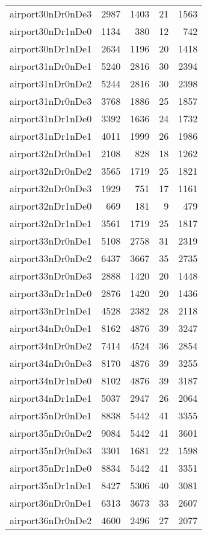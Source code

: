 \begin{longtable}{lrrrr}
airport30nDr0nDe3 & 2987 & 1403 & 21 & 1563 \\
airport30nDr1nDe0 & 1134 & 380 & 12 & 742 \\
airport30nDr1nDe1 & 2634 & 1196 & 20 & 1418 \\
airport31nDr0nDe1 & 5240 & 2816 & 30 & 2394 \\
airport31nDr0nDe2 & 5244 & 2816 & 30 & 2398 \\
airport31nDr0nDe3 & 3768 & 1886 & 25 & 1857 \\
airport31nDr1nDe0 & 3392 & 1636 & 24 & 1732 \\
airport31nDr1nDe1 & 4011 & 1999 & 26 & 1986 \\
airport32nDr0nDe1 & 2108 & 828 & 18 & 1262 \\
airport32nDr0nDe2 & 3565 & 1719 & 25 & 1821 \\
airport32nDr0nDe3 & 1929 & 751 & 17 & 1161 \\
airport32nDr1nDe0 & 669 & 181 & 9 & 479 \\
airport32nDr1nDe1 & 3561 & 1719 & 25 & 1817 \\
airport33nDr0nDe1 & 5108 & 2758 & 31 & 2319 \\
airport33nDr0nDe2 & 6437 & 3667 & 35 & 2735 \\
airport33nDr0nDe3 & 2888 & 1420 & 20 & 1448 \\
airport33nDr1nDe0 & 2876 & 1420 & 20 & 1436 \\
airport33nDr1nDe1 & 4528 & 2382 & 28 & 2118 \\
airport34nDr0nDe1 & 8162 & 4876 & 39 & 3247 \\
airport34nDr0nDe2 & 7414 & 4524 & 36 & 2854 \\
airport34nDr0nDe3 & 8170 & 4876 & 39 & 3255 \\
airport34nDr1nDe0 & 8102 & 4876 & 39 & 3187 \\
airport34nDr1nDe1 & 5037 & 2947 & 26 & 2064 \\
airport35nDr0nDe1 & 8838 & 5442 & 41 & 3355 \\
airport35nDr0nDe2 & 9084 & 5442 & 41 & 3601 \\
airport35nDr0nDe3 & 3301 & 1681 & 22 & 1598 \\
airport35nDr1nDe0 & 8834 & 5442 & 41 & 3351 \\
airport35nDr1nDe1 & 8427 & 5306 & 40 & 3081 \\
airport36nDr0nDe1 & 6313 & 3673 & 33 & 2607 \\
airport36nDr0nDe2 & 4600 & 2496 & 27 & 2077 \\

\end{longtable}
